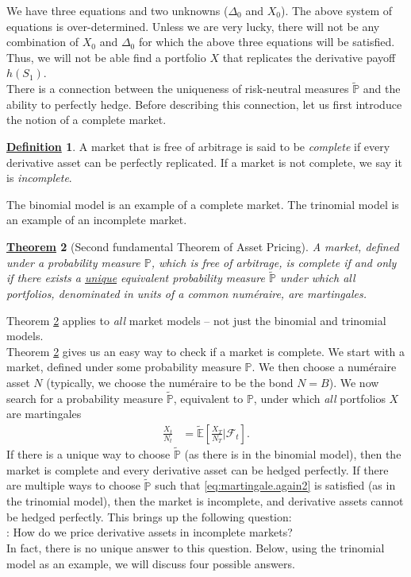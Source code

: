 \documentclass[12pt]{book}
\numberwithin{equation}{chapter}
\theoremstyle{plain}
\newtheorem{theorem}{\underline{Theorem}}
\numberwithin{theorem}{section}
\theoremstyle{definition}
\newtheorem{definition}[theorem]{\underline{Definition}}
\numberwithin{exercise}{chapter}
\renewcommand{\textbf}[1]{\textpdfrender{
  TextRenderingMode=FillStroke,
  LineWidth=.3pt,
}{#1}}
\newcommand{\<}{\langle}
\renewcommand{\>}{\rangle}
\renewcommand{\(}{\left(}
\renewcommand{\)}{\right)}
\renewcommand{\[}{\left[}
\renewcommand{\]}{\right]}
\newcommand\Eb{\mathds{E}}
\newcommand\Pb{\mathds{P}}
\newcommand\Fc{\mathscr{F}}
\newcommand\Del{\Delta}
\newcommand\Ebt{\widetilde{\Eb}}
\newcommand\Pbt{\widetilde{\Pb}}
\theoremstyle{definition}
\numberwithin{question}{section}
\begin{document}
We have three equations and two unknowns ($\Del_0$ and $X_0$).
The above system of equations is over-determined.
Unless we are very lucky, there will not be any combination of $X_0$ and $\Del_0$ for which the above three equations will be satisfied.
Thus, we will not be able find a portfolio $X$ that replicates the derivative payoff $h(S_1)$. 
\\[0.5em]
There is a connection between the uniqueness of risk-neutral measures $\Pbt$ and the ability to perfectly hedge.  Before describing this connection, let us first introduce the notion of a complete market.

\begin{definition}
 A market that is free of arbitrage is said to be \textit{complete} if every derivative asset can be perfectly replicated.  If a market is not complete, we say it is \textit{incomplete}.
\end{definition}

\noindent
The binomial model is an example of a complete market.  The trinomial model is an example of an incomplete market.

\begin{theorem}[Second fundamental Theorem of Asset Pricing]
\label{thm:second}
 A market, defined under a probability measure $\Pb$, which is free of arbitrage, is complete if and only if there exists a \underline{unique} equivalent probability measure $\Pbt$ under which all portfolios, denominated in units of a common num\'eraire, are martingales.
\end{theorem}

\noindent
Theorem \ref{thm:second} applies to \textit{all} market models -- not just the binomial and trinomial models.
\\[0.5em]
Theorem \ref{thm:second} gives us an easy way to check if a market is complete.  We start with a market, defined under some probability measure $\Pb$.  We then choose a num\'eraire asset $N$ (typically, we choose the num\'eraire to be the bond $N=B$).  We now search for a probability measure $\Pbt$, equivalent to $\Pb$, under which \textit{all} portfolios $X$ are martingales
\begin{align}
\frac{X_t}{N_t}
	&=	\Ebt \[ \frac{X_T}{N_T} | \Fc_t \] .  \label{eq:martingale.again2}
\end{align}
If there is a unique way to choose $\Pbt$ (as there is in the binomial model), then the market is complete and every derivative asset can be hedged perfectly.  If there are multiple ways to choose $\Pbt$ such that \eqref{eq:martingale.again2} is satisfied (as in the trinomial model), then the market is incomplete, and derivative assets cannot be hedged perfectly.  This brings up the following question:
\\[0.5em]
\textbf{Question}: How do we price derivative assets in incomplete markets?
\\[0.5em]
In fact, there is no unique answer to this question.  Below, using the trinomial model as an example, we will discuss four possible answers.
\end{document}
